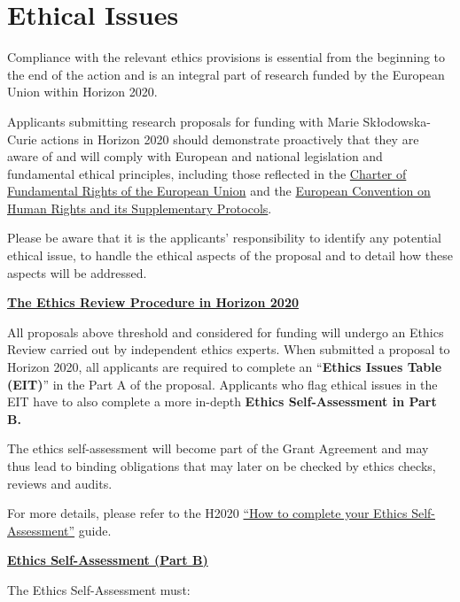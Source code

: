 \newpage
\section{Ethical Issues}
\label{sec:ethics}

Compliance with the relevant ethics provisions is essential from the beginning to the end of the action and is an integral part of research funded by the European Union within Horizon 2020. 

\medskip\noindent
Applicants submitting research proposals for funding with Marie Sk\l{}odowska-Curie actions in Horizon 2020 should demonstrate proactively that they are aware of and will comply with European and national legislation and fundamental ethical principles, including those reflected in the \href{http://www.europarl.europa.eu/charter/pdf/text_en.pdf}{Charter of Fundamental Rights of the European Union} and the \href{http://www.echr.coe.int/Documents/Convention_ENG.pdf}{European Convention on Human Rights and its Supplementary Protocols}.

\medskip\noindent
Please be aware that it is the applicants' responsibility to identify any potential ethical issue, 
to handle the ethical aspects of the proposal and to detail how these aspects will be addressed.

\bigskip\noindent
{\large {\bf \ul{The Ethics Review Procedure in Horizon 2020}}}

\medskip\noindent
All proposals above threshold and considered for funding will undergo an Ethics Review carried out by independent ethics experts. 
When submitted a proposal to Horizon 2020, all applicants are required to complete an ``{\bf Ethics Issues Table (EIT)}'' in the Part A of the proposal. 
Applicants who flag ethical issues in the EIT have to also complete a more in-depth {\bf Ethics Self-Assessment in Part B.}

\medskip\noindent
The ethics self-assessment will become part of the Grant Agreement and may thus lead to binding obligations that may later on be checked by ethics checks, reviews and audits.

\medskip\noindent
For more details, please refer to the H2020 \href{http://ec.europa.eu/research/participants/data/ref/h2020/grants_manual/hi/ethics/h2020_hi_ethics-self-assess_en.pdf}{``How to complete your Ethics Self-Assessment''} guide.

\bigskip\noindent
{\large {\bf \ul{Ethics Self-Assessment (Part B)}}}

\medskip\noindent
The Ethics Self-Assessment must:

